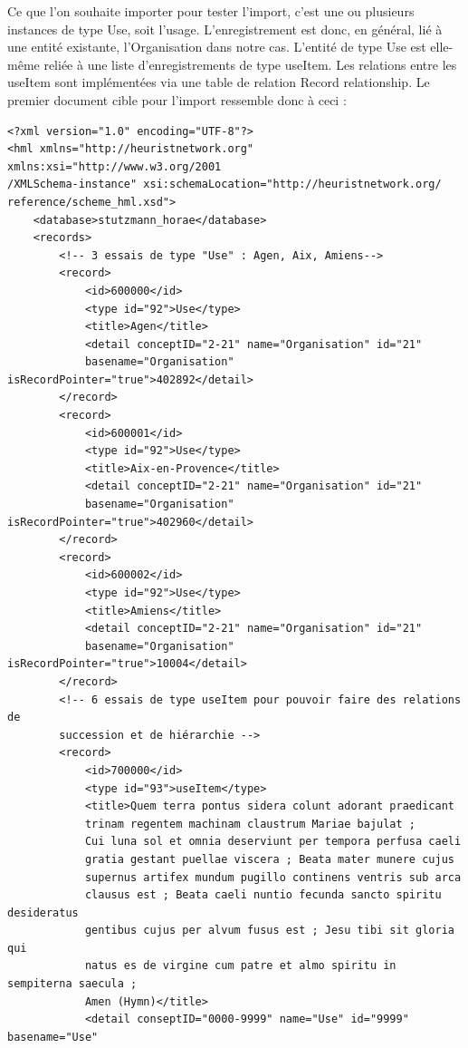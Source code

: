 \documentclass[a4paper,12pt,twoside]{book}
\begin{document}
Ce que l'on souhaite importer pour tester l'import, c’est une ou plusieurs instances de type \og Use\fg{}, soit l'usage. L'enregistrement est donc, en général, lié à une entité existante, l'Organisation dans notre cas. L'entité de type \og Use\fg{} est elle-même reliée à une liste d'enregistrements de type \og useItem\fg{}. Les relations entre les \og useItem\fg{} sont implémentées via une table de relation \og Record relationship\fg{}. Le premier document cible pour l'import ressemble donc à ceci : 
\begin{verbatim}
<?xml version="1.0" encoding="UTF-8"?>
<hml xmlns="http://heuristnetwork.org" xmlns:xsi="http://www.w3.org/2001
/XMLSchema-instance" xsi:schemaLocation="http://heuristnetwork.org/
reference/scheme_hml.xsd">
    <database>stutzmann_horae</database>
    <records>
        <!-- 3 essais de type "Use" : Agen, Aix, Amiens-->
        <record>
            <id>600000</id>
            <type id="92">Use</type>
            <title>Agen</title>
            <detail conceptID="2-21" name="Organisation" id="21" 
            basename="Organisation" isRecordPointer="true">402892</detail>
        </record>
        <record>
            <id>600001</id>
            <type id="92">Use</type>
            <title>Aix-en-Provence</title>
            <detail conceptID="2-21" name="Organisation" id="21"
            basename="Organisation" isRecordPointer="true">402960</detail>
        </record>
        <record>
            <id>600002</id>
            <type id="92">Use</type>
            <title>Amiens</title>
            <detail conceptID="2-21" name="Organisation" id="21" 
            basename="Organisation" isRecordPointer="true">10004</detail>
        </record>
        <!-- 6 essais de type useItem pour pouvoir faire des relations de 
        succession et de hiérarchie -->
        <record>
            <id>700000</id>
            <type id="93">useItem</type>
            <title>Quem terra pontus sidera colunt adorant praedicant
            trinam regentem machinam claustrum Mariae bajulat ; 
            Cui luna sol et omnia deserviunt per tempora perfusa caeli 
            gratia gestant puellae viscera ; Beata mater munere cujus
            supernus artifex mundum pugillo continens ventris sub arca 
            clausus est ; Beata caeli nuntio fecunda sancto spiritu desideratus 
            gentibus cujus per alvum fusus est ; Jesu tibi sit gloria qui 
            natus es de virgine cum patre et almo spiritu in sempiterna saecula ;
            Amen (Hymn)</title>
            <detail conseptID="0000-9999" name="Use" id="9999" basename="Use"

\end{verbatim}
\end{document}
